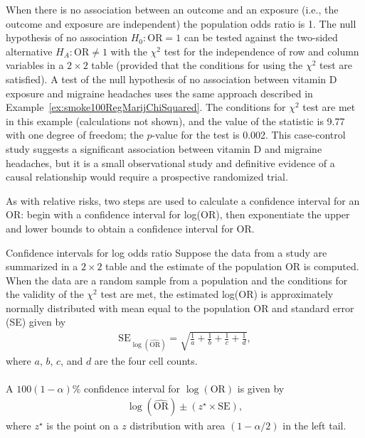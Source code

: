 When there is no association between an outcome and an exposure (i.e., the outcome and exposure are independent) the population odds ratio is 1. The null hypothesis of no association $H_0:\text{OR} = 1$ can be tested against the two-sided alternative $H_A:\text{OR} \neq 1$ with the $\chi^2$ test for the independence of row and column variables in a $2 \times 2$ table (provided that the conditions for using the $\chi^2$ test are satisfied). A test of the null hypothesis of no association between vitamin D exposure and migraine  headaches uses the same approach described in Example~\ref{ex:smoke100RegMarijChiSquared}.  The conditions for $\chi^2$ test are met in this example (calculations not shown), and the value of the statistic is 9.77 with one degree of freedom; the $p$-value for the test is 0.002.  This case-control study suggests a significant association between vitamin D and migraine headaches, but it is a small observational study and definitive evidence of a causal relationship would require a prospective randomized trial.

As with relative risks, two steps are used to calculate a confidence interval for an OR: begin with a confidence interval for log(OR), then exponentiate the upper and lower bounds to obtain a confidence interval for OR.

\begin{onebox}{Confidence intervals for log odds ratio}
  Suppose the data from a study are summarized in a $2 \times 2$ table and the estimate of the population OR is computed. When the data are a random sample from a population and the conditions for the validity of the $\chi^2$ test are met, the estimated log(OR) is approximately normally distributed with mean equal to the population OR and standard error (SE) given by
  \begin{align*}
    \text{SE}_{\log(\widehat{\text{OR}})} = \sqrt{\frac{1}{a} + \frac{1}{b}
   + \frac{1}{c} + \frac{1}{d}},
  \end{align*}
  where $a$, $b$, $c$, and $d$ are the four cell counts. \\
  \\
   A $100(1  - \alpha)\%$ confidence interval for $\log(\text{OR})$ is given by
\begin{align}
  \log(\widehat{\text{OR}}) \pm (z^{\star} \times \text{SE}),
  \label{eqn:confidenceIntervalOR}
\end{align}
where $z^{\star}$ is the point on a $z$  distribution with area $(1 - \alpha/2)$ in the left tail.
\end{onebox}

